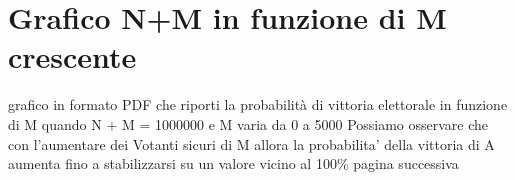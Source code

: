 \documentclass{article}
\begin{document}
\section{Grafico N+M in funzione di M crescente}
grafico in formato PDF che riporti la probabilità di vittoria elettorale
in funzione di M quando N + M = 1000000 e M varia da 0 a 5000
Possiamo osservare che con l'aumentare dei Votanti sicuri di M allora la probabilita' della vittoria di A aumenta fino a stabilizzarsi su un valore vicino al 100\%
pagina successiva


\end{document}
